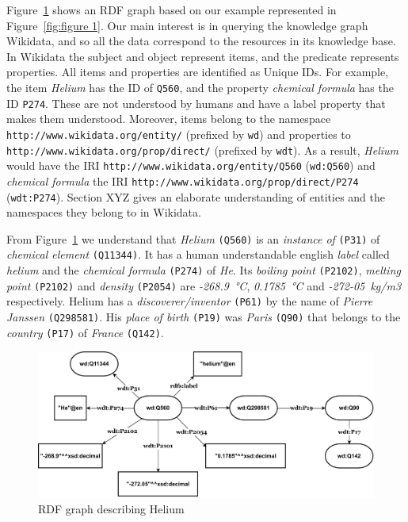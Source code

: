 Figure~\ref{fig:figure 3} shows an RDF graph based on our example represented in Figure~\ref{fig:figure 1}. Our main interest is in querying the knowledge graph Wikidata, and so all the data correspond to the resources in its knowledge base. In Wikidata the subject and object represent items, and the predicate represents properties. All items and properties are identified as Unique IDs. For example, the item \textit{Helium} has the ID of \texttt{Q560}, and the property \textit{chemical formula} has the ID \texttt{P274}. These are not understood by humans and have a label property that makes them understood. Moreover, items belong to the namespace \texttt{http://www.wikidata.org/entity/} (prefixed by \texttt{wd}) and properties to \texttt{http://www.wikidata.org/prop/direct/} (prefixed by \texttt{wdt}). As a result, \textit{Helium} would have the IRI \texttt{http://www.wikidata.org/entity/Q560} (\texttt{wd:Q560}) and \textit{chemical formula} the IRI \texttt{http://www.wikidata.org/prop/direct/P274} (\texttt{wdt:P274}). Section XYZ gives an elaborate understanding of entities and the namespaces they belong to in Wikidata.

From Figure~\ref{fig:figure 3} we understand that \textit{Helium} \texttt{(\gls{Q560})} is an \textit{instance of} \texttt{(P31)} of \textit{chemical element} \texttt{(Q11344)}. It has a human understandable english \textit{label} called \textit{helium} and the \textit{chemical formula} \texttt{(P274)} of \textit{He}. Its \textit{boiling point} \texttt{(P2102)}, \textit{melting point} \texttt{(P2102)} and \textit{density} \texttt{(P2054)} are \textit{-268.9~°C}, \textit{0.1785~°C} and \textit{-272-05~kg/m3} respectively. Helium has a \textit{discoverer/inventor} \texttt{(P61)} by the name of \textit{Pierre Janssen} \texttt{(Q298581)}. His \textit{place of birth} \texttt{(P19)} was \textit{Paris} \texttt{(Q90)} that belongs to the \textit{country} \texttt{(P17)} of \textit{France} \texttt{(Q142)}.

\begin{figure}[h]
  \centering
  \includegraphics[width=0.75 \linewidth]{images/rdf_graph.drawio.pdf}
  \caption{RDF graph describing Helium}
  \label{fig:figure 3}
\end{figure}

